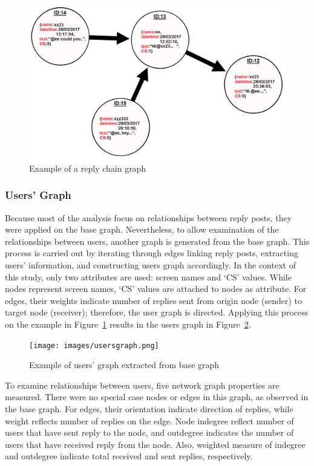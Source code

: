 \documentclass[sigconf]{acmart}
\begin{document}
{\begin{figure}[htb]
\centering
\includegraphics[width=\columnwidth]{images/replychaingraph.png}
\caption{Example of a reply chain graph}
\label{fig:replychaingraph}
\end{figure}

\subsubsection{Users' Graph}

Because most of the analysis focus on relationships between reply
posts, they were applied on the base graph. Nevertheless, to allow
examination of the relationships between users, another graph is
generated from the base graph. This process is carried out by
iterating through edges linking reply posts, extracting users'
information, and constructing users graph accordingly. In the context
of this study, only two attributes are used: screen names and
`CS' values. While nodes represent screen names, `CS' values
are attached to nodes as attribute. For edges, their weights indicate
number of replies sent from origin node (sender) to target node
(receiver); therefore, the user graph is directed. Applying this
process on the example in Figure~\ref{fig:replychaingraph} results in
the users graph in Figure~\ref{fig:usersgraph}.

\begin{figure}[htb]
\centering
\texttt{[image: images/usersgraph.png]}
\caption{Example of users' graph extracted from base graph}
\label{fig:usersgraph}
\end{figure}

To examine relationships between users, five network graph properties
are measured. There were no special case nodes or edges in this graph,
as observed in the base graph. For edges, their orientation indicate
direction of replies, while weight reflects number of replies on the
edge.  Node indegree reflect number of users that have sent reply to
the node, and outdegree indicates the number of users that have
received reply from the node. Also, weighted measure of indegree and
outdegree indicate total received and sent replies, respectively.

}
\end{document}
